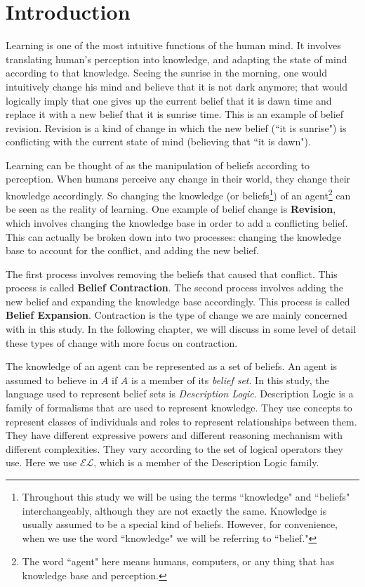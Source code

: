 \chapter{Introduction}

Learning is one of the most intuitive functions of the human mind. It involves translating human's perception into knowledge, and adapting the state of mind according to that knowledge. Seeing the sunrise in the morning, one would intuitively change his mind and believe that it is not dark anymore; that would logically imply that one gives up the current belief that it is dawn time and replace it with a new belief that it is sunrise time. This is an example of belief revision. Revision is a kind of change in which the new belief (``it is sunrise") is conflicting with the current state of mind (believing that ``it is dawn"). 

Learning can be thought of as the manipulation of beliefs according to perception. When humans perceive any change in their world, they change their knowledge accordingly. So changing the knowledge (or beliefs\footnote{Throughout this study we will be using the terms ``knowledge" and ``beliefs" interchangeably, although they are not exactly the same. Knowledge is usually assumed to be a special kind of beliefs. However, for convenience, when we use the word ``knowledge" we will be referring to ``belief." }) of an agent\footnote{The word ``agent" here means humans, computers, or any thing that has knowledge base and perception.} can be seen as the reality of learning. One example of belief change is \textbf{Revision}, which involves changing the knowledge base in order to add a conflicting belief. This can actually be broken down into two processes: changing the knowledge base to account for the conflict, and adding the new belief. 

The first process involves removing the beliefs that caused that conflict. This process is called \textbf{Belief Contraction}. The second process involves adding the new belief and expanding the knowledge base accordingly. This process is called \textbf{Belief Expansion}. Contraction is the type of change we are mainly concerned with in this study. In the following chapter, we will discuss in some level of detail these types of change with more focus on contraction.

The knowledge of an agent can be represented as a set of beliefs. An agent is assumed to believe in $A$ if $A$ is a member of its \textit{belief set}. In this study, the language used to represent belief sets is \textit{Description Logic}. Description Logic is a family of formalisms that are used to represent knowledge. They use concepts to represent classes of individuals and roles to represent relationships between them. They have different expressive powers and different reasoning mechanism with different complexities. They vary according to the set of logical operators they use. Here we use $\mathcal{EL}$, which is a member of the Description Logic family.

